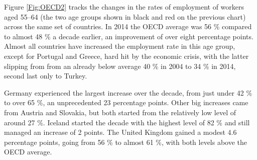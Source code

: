 \documentclass[11 pt, a4paper]{report}
\begin{document}
Figure \ref{Fig:OECD2} tracks the changes in the rates of employment of workers aged 55--64 (the two age groups shown in black and red on the previous chart) across the same set of countries. In 2014 the OECD average was 56 \% compared to almost 48 \% a decade earlier, an improvement of over eight percentage points. Almost all countries have increased the employment rate in this age group, except for Portugal and Greece, hard hit by the economic crisis, with the latter slipping from from an already below average 40 \% in 2004 to 34 \% in 2014, second last only to Turkey. 

Germany experienced the largest increase over the decade, from just under 42 \% to over 65 \%, an unprecedented 23 percentage points. Other big increases came from Austria and Slovakia, but both started from the relatively low level of around 27 \%. Iceland started the decade with the highest level of 82 \% and still managed an increase of 2 points. The United Kingdom gained a modest 4.6 percentage points, going from 56 \% to almost 61 \%, with both levels above the OECD average. 
\end{document}
